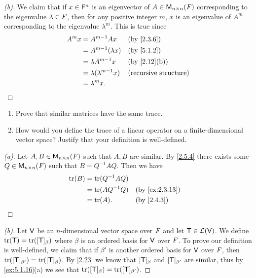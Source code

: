 \begin{proof}[(b)]
	We claim that if \(x \in \mathsf{F}^n\) is an eigenvector of \(A \in \mathsf{M}_{{n} \times n}({\mathit{F}})\) corresponding to the eigenvalue \(\lambda \in \mathit{F}\), then for any positive integer \(m\), \(x\) is an eigenvalue of \(A^m\) corresponding to the eigenvalue \(\lambda^m\).
	This is true since
	\begin{align*}
		A^m x & = A^{m - 1} Ax                &  & \by{2.3.6}                   \\
		      & = A^{m - 1}(\lambda x)        &  & \by{5.1.2}                   \\
		      & = \lambda A^{m - 1} x         &  & \by{2.12}[b]                 \\
		      & = \lambda (\lambda^{m - 1} x) &  & \text{(recursive structure)} \\
		      & = \lambda^m x.
	\end{align*}
\end{proof}

\begin{ex}\label{ex:5.1.16}
	\begin{enumerate}
		\item Prove that similar matrices have the same trace.
		\item How would you define the trace of a linear operator on a finite-dimensional vector space?
		      Justify that your definition is well-defined.
	\end{enumerate}
\end{ex}

\begin{proof}[(a)]
	Let \(A, B \in \mathsf{M}_{{n} \times n}({\mathit{F}})\) such that \(A, B\) are similar.
	By \cref{2.5.4} there exists some \(Q \in \mathsf{M}_{{n} \times n}({\mathit{F}})\) such that \(B = Q^{-1} A Q\).
	Then we have
	\begin{align*}
		\tr(B) & = \tr(Q^{-1} A Q)                     \\
		       & = \tr(A Q^{-1} Q) &  & \by{ex:2.3.13} \\
		       & = \tr(A).         &  & \by{2.4.3}
	\end{align*}
\end{proof}

\begin{proof}[(b)]
	Let \(\mathsf{V}\) be an \(n\)-dimensional vector space over \(\mathit{F}\) and let \(\mathsf{T} \in \mathcal{L}(\mathsf{V})\).
	We define \(\tr(\T) = \tr([\T]_{\beta})\) where \(\beta\) is an ordered basis for \(\mathsf{V}\) over \(\mathit{F}\).
	To prove our definition is well-defined, we claim that if \(\beta'\) is another ordered basis for \(\mathsf{V}\) over \(\mathit{F}\), then \(\tr([\T]_{\beta'}) = \tr([\T]_{\beta})\).
	By \cref{2.23} we know that \([\mathsf{T}]_{\beta}\) and \([\mathsf{T}]_{\beta'}\) are similar, thus by \cref{ex:5.1.16}(a) we see that \(\tr([\T]_{\beta}) = \tr([\T]_{\beta'})\).
\end{proof}


